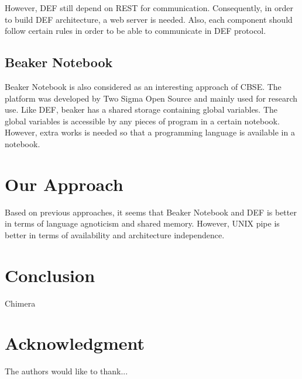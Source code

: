 \documentclass[conference]{IEEEtran}
\begin{document}
However, DEF still depend on REST for communication. Consequently, in order to 
build DEF architecture, a web server is needed. Also, each component should 
follow certain rules in order to be able to communicate in DEF protocol.

\subsection{Beaker Notebook}

Beaker Notebook \cite{beakernotebook} is also considered as an interesting 
approach of CBSE. The platform was developed by Two Sigma Open Source and 
mainly used for research use. Like DEF, beaker has a shared storage containing 
global variables. The global variables is accessible by any pieces of program 
in a certain notebook. However, extra works is needed so that a programming 
language is available in a notebook.

\section{Our Approach}

Based on previous approaches, it seems that Beaker Notebook and DEF is better 
in terms of language agnoticism and shared memory. However, UNIX pipe is 
better in terms of availability and architecture independence.

\section{Conclusion}
Chimera 


\section*{Acknowledgment}
The authors would like to thank...

\ifCLASSOPTIONcaptionsoff
  \newpage
\fi




\end{document}
